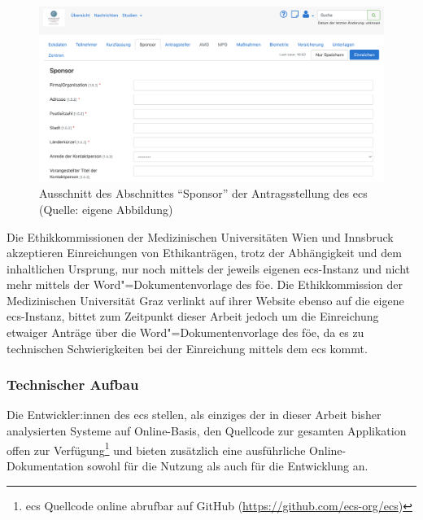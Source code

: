 \documentclass[a4paper,12pt,twoside]{scrreprt}
\begin{document}
\begin{figure}[ht]
    \centering
    \includegraphics[width=\linewidth]{thesis/images/Luidold_ECS-Schritt-Eckdaten.png}
    \caption[Ausschnitt des Abschnittes \enquote{Sponsor} der Antragsstellung des \acl{ecs}]{Ausschnitt des Abschnittes \enquote{Sponsor} der Antragsstellung des \acl{ecs} (Quelle: eigene Abbildung)}
    \label{fig:abschnitt-sponsor-ecs}
\end{figure}

Die Ethikkommissionen der Medizinischen Universitäten Wien und Innsbruck akzeptieren Einreichungen von Ethikanträgen, trotz der Abhängigkeit und dem inhaltlichen Ursprung, nur noch mittels der jeweils eigenen \ac{ecs}-Instanz und nicht mehr mittels der Word"=Dokumentenvorlage des \ac{föe}. \cite{ethikkommission_der_medizinischen_universitat_wien_ethik_2023, medizinische_universitat_innsbruck_einreichungen_2023} Die Ethikkommission der Medizinischen Universität Graz verlinkt auf ihrer Website ebenso auf die eigene \ac{ecs}-Instanz, bittet zum Zeitpunkt dieser Arbeit jedoch um die Einreichung etwaiger Anträge über die Word"=Dokumentenvorlage des \ac{föe}, da es zu technischen Schwierigkeiten bei der Einreichung mittels dem \ac{ecs} kommt. \cite{medizinische_universitat_graz_ethikkommission_2023}

\subsubsection*{Technischer Aufbau}
\label{sub-sub-sec:ecs-technischer-aufbau}

Die Entwickler:innen des \acl{ecs} stellen, als einziges der in dieser Arbeit bisher analysierten Systeme auf Online-Basis, den Quellcode zur gesamten Applikation offen zur Verfügung\footnote{\ac{ecs} Quellcode online abrufbar auf GitHub (\url{https://github.com/ecs-org/ecs})} und bieten zusätzlich eine ausführliche Online-Dokumentation sowohl für die Nutzung als auch für die Entwicklung an. \cite{medizinische_universitat_wien_ecs_2021-1, medizinische_universitat_wien_development_2021, medizinische_universitat_wien_installationusage_2021}
\end{document}
